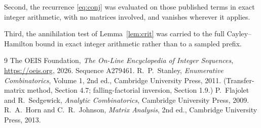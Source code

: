\documentclass[11pt,a4paper]{article}
\theoremstyle{plain}
\theoremstyle{definition}
\begin{document}
Second, the recurrence \eqref{eq:conj} was evaluated on those published terms in exact
integer arithmetic, with no matrices involved, and vanishes wherever it applies.

Third, the annihilation test of Lemma~\ref{lem:crit} was carried to the full
Cayley--Hamilton bound in exact integer arithmetic rather than to a sampled prefix.

\begin{thebibliography}{9}
 The OEIS Foundation, \emph{The On-Line Encyclopedia of Integer
Sequences}, \url{https://oeis.org}, 2026. Sequence A279461.
 R.~P.~Stanley, \emph{Enumerative Combinatorics}, Volume 1, 2nd ed.,
Cambridge University Press, 2011. (Transfer-matrix method, Section 4.7; falling-factorial
inversion, Section 1.9.)
 P.~Flajolet and R.~Sedgewick, \emph{Analytic Combinatorics}, Cambridge
University Press, 2009.
 R.~A.~Horn and C.~R.~Johnson, \emph{Matrix Analysis}, 2nd ed., Cambridge
University Press, 2013.
\end{thebibliography}
\end{document}
